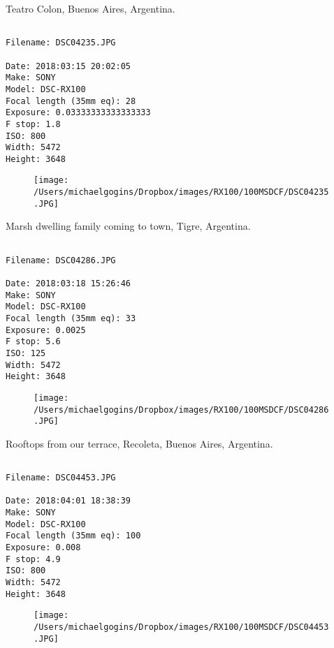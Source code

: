 \clearpage
\onecolumn
\noindent Teatro Colon, Buenos Aires, Argentina.
\noindent
\begin{lstlisting}

Filename: DSC04235.JPG

Date: 2018:03:15 20:02:05
Make: SONY
Model: DSC-RX100
Focal length (35mm eq): 28
Exposure: 0.03333333333333333
F stop: 1.8
ISO: 800
Width: 5472
Height: 3648
\end{lstlisting}
\clearpage

\begin{figure}
\texttt{[image: /Users/michaelgogins/Dropbox/images/RX100/100MSDCF/DSC04235.JPG]}
\end{figure}
    
\clearpage
\onecolumn
\noindent Marsh dwelling family coming to town, Tigre, Argentina.
\noindent
\begin{lstlisting}

Filename: DSC04286.JPG

Date: 2018:03:18 15:26:46
Make: SONY
Model: DSC-RX100
Focal length (35mm eq): 33
Exposure: 0.0025
F stop: 5.6
ISO: 125
Width: 5472
Height: 3648
\end{lstlisting}
\clearpage

\begin{figure}
\texttt{[image: /Users/michaelgogins/Dropbox/images/RX100/100MSDCF/DSC04286.JPG]}
\end{figure}
    
\clearpage
\onecolumn
\noindent Rooftops from our terrace, Recoleta, Buenos Aires, Argentina.
\noindent
\begin{lstlisting}

Filename: DSC04453.JPG

Date: 2018:04:01 18:38:39
Make: SONY
Model: DSC-RX100
Focal length (35mm eq): 100
Exposure: 0.008
F stop: 4.9
ISO: 800
Width: 5472
Height: 3648
\end{lstlisting}
\clearpage

\begin{figure}
\texttt{[image: /Users/michaelgogins/Dropbox/images/RX100/100MSDCF/DSC04453.JPG]}
\end{figure}
    
